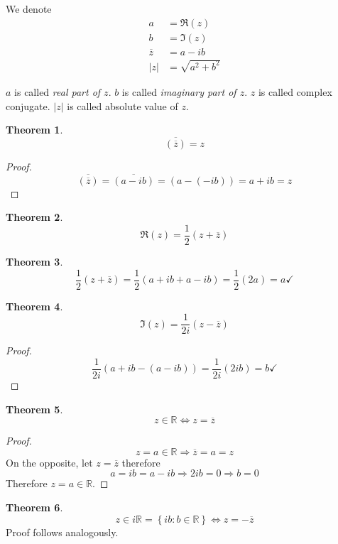 \documentclass[a4paper,landscape,twocolumn]{article}
\theoremstyle{definition}
\newtheorem{theorem}{Theorem}
\newcommand\set[1]{\left\{#1\right\}}
\newcommand\abs[1]{\left|#1\right|}
\begin{document}
We denote
\begin{align*}
  a &= \Re(z) \\
  b &= \Im(z) \\
  \overline{z} &= a - ib \\
  \abs{z} &= \sqrt{a^2 + b^2}
\end{align*}

$a$ is called \emph{real part of $z$}. $b$ is called \emph{imaginary part of $z$}.
$z$ is called complex conjugate. $\abs{z}$ is called absolute value of $z$.

\begin{theorem}
  \[  \overline{(\overline{z})} = z  \]
\end{theorem}

\begin{proof}
  \[ \overline{(\overline{z})} = \overline{(a - ib)} = (a - (-ib)) = a + ib  = z \]
\end{proof}

\begin{theorem}
  \[ \Re(z) = \frac12 (z + \overline z) \]
\end{theorem}

\begin{theorem}
  \[ \frac12(z + \overline{z}) = \frac12(a + ib + a - ib) = \frac12 (2a) = a \checkmark \]
\end{theorem}

\begin{theorem}
  \[ \Im(z) = \frac{1}{2i} (z - \overline{z}) \]
\end{theorem}

\begin{proof}
  \[ \frac{1}{2i} (a + ib - (a - ib)) = \frac{1}{2i} (2ib) = b \checkmark \]
\end{proof}

\begin{theorem}
  \[ z \in \mathbb R \Leftrightarrow z = \overline{z} \]
\end{theorem}
\begin{proof}
  \[ z = a \in \mathbb R \Rightarrow \overline{z} = a = z \]
  On the opposite, let $z = \overline{z}$ therefore
  \[ a = ib = a - ib \Rightarrow 2ib = 0 \Rightarrow b = 0 \]
  Therefore $z = a \in \mathbb R$.
\end{proof}

\begin{theorem}
  \[ z \in i \mathbb R = \set{ib : b \in \mathbb R} \Leftrightarrow z = -\overline{z} \]
  Proof follows analogously.
\end{theorem}
\end{document}
